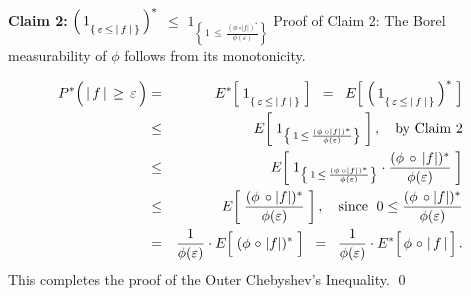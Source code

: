 \vskip 0.5cm
\noindent
\textbf{Claim 2:}\;\;
$\left(\,1_{\{\,\varepsilon\,\leq\,\vert\,\overset{{\color{white}.}}{f}\,\vert\,\}}\,\right)^{*}$
\;\;$\leq$\;\;
$1_{\left\{\,1\,\leq\,\frac{(\phi\,\circ\vert f \vert)^{*}}{\phi(\varepsilon)}\right\}}$
\vskip 0.1cm
\noindent
Proof of Claim 2: The Borel measurability of $\phi$ follows from its monotonicity.

\vskip 0.5cm
\begin{eqnarray*}
P^{*}\!\left(\,\vert\,\overset{{\color{white}.}}{f}\,\vert\,\geq\,\varepsilon\,\right)
&=&
	E^{*}\!\left[\;1_{\{\,\varepsilon\,\leq\,\vert\,\overset{{\color{white}.}}{f}\,\vert\,\}}\;\right]
\;\;=\;\;
	E\!\left[\;\left(\,1_{\{\,\varepsilon\,\leq\,\vert\,\overset{{\color{white}.}}{f}\,\vert\,\}}\,\right)^{*}\;\right]
\\
&\leq&
	E\!\left[\;1_{\left\{\,1\,\leq\,\frac{(\phi\,\circ\vert f \vert)^{*}}{\phi(\varepsilon)}\right\}}\;\right],
	\quad
	\textnormal{by Claim 2}
\\
&\leq&
	E\!\left[\;
		1_{\left\{\,1\,\leq\,\frac{(\phi\,\circ\vert f \vert)^{*}}{\phi(\varepsilon)}\right\}}
		\cdot
		\dfrac{(\phi\,\circ\,\vert f \vert)^{*}}{\phi(\varepsilon)}
		\;\right]
\\
&\leq&
	E\!\left[\; \dfrac{(\phi\,\circ\vert f \vert)^{*}}{\phi(\varepsilon)} \;\right],
	\quad
	\textnormal{since \;$0 \leq \dfrac{(\phi\,\circ\vert f \vert)^{*}}{\phi(\varepsilon)}$}
\\
&=&
	\dfrac{1}{\phi(\varepsilon)} \cdot E\!\left[\; (\phi\overset{{\color{white}-}}{\circ}\vert f \vert)^{*} \;\right]
\;\;=\;\;
	\dfrac{1}{\phi(\varepsilon)} \cdot E^{*}\!\left[\,\phi\overset{{\color{white}-}}{\circ}\vert\,f\,\vert\,\right].
\end{eqnarray*}
This completes the proof of the Outer Chebyshev's Inequality.
\qed



\renewcommand{\theenumi}{\roman{enumi}}
\renewcommand{\labelenumi}{\textnormal{(\theenumi)}$\;\;$}

